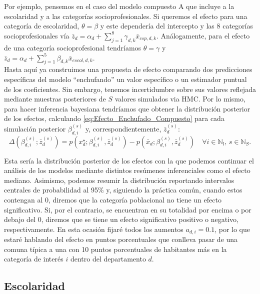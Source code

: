 Por ejemplo, pensemos en el caso del modelo compuesto A que incluye a la escolaridad y a las categorías socioprofesionales. Si queremos el efecto para una categoría de escolaridad, $\theta = \beta$ y este dependería del intercepto y las 8 categorías socioprofesionales vía $\bar{z}_d = \alpha_d + \sum\limits_{j=1}^8 \gamma_{d,k}\bar{x}_{csp,d,k}$. Análogamente, para el efecto de una categoría socioprofesional tendríamos $\theta = \gamma$ y $\bar{z}_d = \alpha_d + \sum\limits_{j=1}^5 \beta_{d,k}\bar{x}_{escol,d,k}$.\\

Hasta aquí ya construimos una propuesta de efecto comparando dos predicciones específicas del modelo ``enchufando'' un valor específico o un estimador puntual de los coeficientes. Sin embargo, tenemos incertidumbre sobre sus valores reflejada mediante muestras posteriores de $S$ valores simulados via HMC. Por lo mismo, para hacer inferencia bayesiana tendríamos que obtener la distribución posterior de los efectos, calculando \eqref{eq:Efecto_Enchufado_Compuesto} para cada simulación posterior $\beta_{d,i}^{(s)}$ y, correspondientemente, $\bar{z}_d^{(s)}$:
\begin{equation*}
\Delta(\beta_{d,i}^{(s)};\bar{z}_d^{(s)}) =  p(x^\star_{d};\beta_{d,i}^{(s)},\bar{z}_d^{(s)})-p(\bar{x}_{d};\beta_{d,i}^{(s)},\bar{z}_d^{(s)}) \quad \forall i \in \mathbb{N}_l ,\, s \in \mathbb{N}_S.
\end{equation*}

Esta sería la distribución posterior de los efectos con la que podemos continuar el análisis de los modelos mediante distintos resúmenes inferenciales como el efecto mediano. Asimismo, podemos resumir la distribución reportando intervalos centrales de probabilidad al 95\% y, siguiendo la práctica común, cuando estos contengan al 0, diremos que la categoría poblacional no tiene un efecto significativo. Si, por el contrario, se encuentran en su totalidad por encima o por debajo del 0, diremos que se tiene un efecto significativo positivo o negativo, respectivamente. En esta ocasión fijaré todos los aumentos $a_{d,i}=0.1$, por lo que estaré hablando del efecto en puntos porcentuales que conlleva pasar de una comuna típica a una con 10 puntos porcentuales de habitantes más en la categoría de interés $i$ dentro del departamento $d$.

\subsection{Escolaridad}

